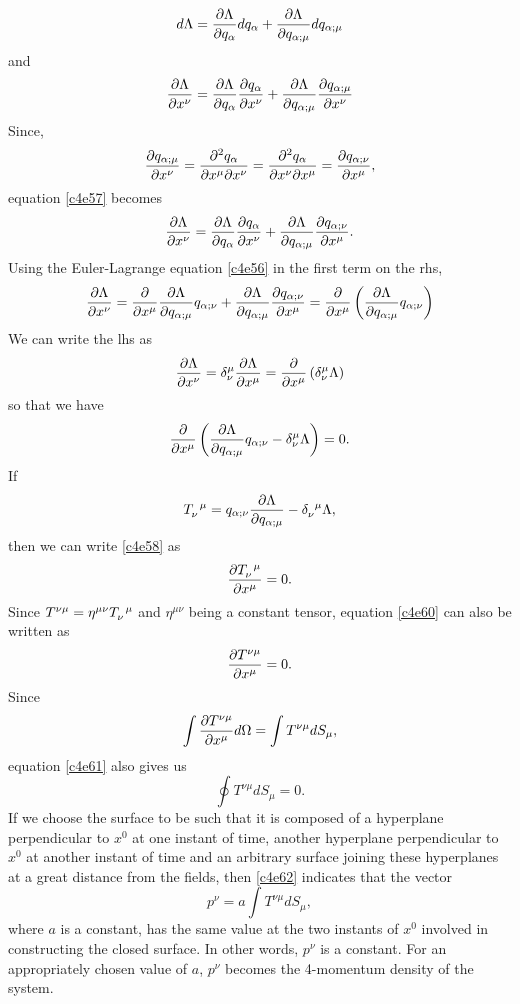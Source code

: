 \begin{enumerate}
\[
d\Lambda = \frac{\partial{\Lambda}}{\partial{q_\alpha}}dq_\alpha + 
\frac{\partial{\Lambda}}{\partial{q_{\alpha;\mu}}}dq_{\alpha;\mu}
\]
and
\begin{equation}\label{c4e57}
\frac{\partial{\Lambda}}{\partial{x^\nu}} = \frac{\partial{\Lambda}}{\partial{q_\alpha}}\frac{\partial{q_\alpha}}{\partial{x^\nu}} + 
\frac{\partial{\Lambda}}{\partial{q_{\alpha;\mu}}}\frac{\partial{q_{\alpha;\mu}}}{\partial{x^\nu}}
\end{equation}
Since,
\[
\frac{\partial{q_{\alpha;\mu}}}{\partial{x^\nu}} = 
\frac{\partial^2 q_\alpha}{\partial x^\mu \partial x^\nu}
= \frac{\partial^2 q_\alpha}{\partial x^\nu \partial x^\mu} =
\frac{\partial{q_{\alpha;\nu}}}{\partial{x^\mu}},
\]
equation \eqref{c4e57} becomes
\[
\frac{\partial{\Lambda}}{\partial{x^\nu}} = \frac{\partial{\Lambda}}{\partial{q_\alpha}}\frac{\partial{q_\alpha}}{\partial{x^\nu}} + 
\frac{\partial{\Lambda}}{\partial{q_{\alpha;\mu}}}\frac{\partial{q_{\alpha;\nu}}}{\partial{x^\mu}}.
\]
Using the Euler-Lagrange equation \eqref{c4e56} in the first term on the rhs,
\[
\frac{\partial{\Lambda}}{\partial{x^\nu}} = \frac{\partial}{\partial x^\mu}
\frac{\partial{\Lambda}}{\partial{q_{\alpha;\mu}}}
q_{\alpha;\nu} + \frac{\partial{\Lambda}}{\partial{q_{\alpha;\mu}}}\frac{\partial{q_{\alpha;\nu}}}{\partial{x^\mu}} =
\frac{\partial}{\partial x^\mu}
\left(\frac{\partial{\Lambda}}{\partial{q_{\alpha;\mu}}}q_{\alpha;\nu}\right)
\]
We can write the lhs as
\[
\frac{\partial{\Lambda}}{\partial{x^\nu}} = \delta^\mu_\nu\frac{\partial{\Lambda}}{\partial{x^\mu}} = 
\frac{\partial}{\partial x^\mu}\left(\delta^\mu_\nu \Lambda\right)
\]
so that we have
\begin{equation}\label{c4e58}
\frac{\partial}{\partial x^\mu}
\left(\frac{\partial{\Lambda}}{\partial{q_{\alpha;\mu}}}q_{\alpha;\nu} - 
\delta^\mu_\nu \Lambda\right) = 0.
\end{equation}
If
\begin{equation}\label{c4e59}
\tensor{T}{_\nu^\mu} = q_{\alpha;\nu}\pdt{\Lambda}{q_{\alpha;\mu}} - 
\tensor{\delta}{_\nu^\mu} \Lambda,
\end{equation}
then we can write \eqref{c4e58} as
\begin{equation}\label{c4e60}
\pdt{\tensor{T}{_\nu^\mu}}{x^\mu} = 0.
\end{equation}
Since $T^{\nu\mu} = \eta^{\mu\nu}\tensor{T}{_\nu^\mu}$ and $\eta^{\mu\nu}$ 
being a constant tensor, equation \eqref{c4e60} can also be written as
\begin{equation}\label{c4e61}
\frac{\partial{T^{\nu\mu}}}{\partial{x^\mu}} = 0.
\end{equation}
Since
\[
\int \frac{\partial{T^{\nu\mu}}}{\partial{x^\mu}} d\Omega = \int T^{\nu\mu} dS_\mu,
\]
equation \eqref{c4e61} also gives us
\begin{equation}\label{c4e62}
\oint T^{\nu\mu} dS_\mu = 0.
\end{equation}
If we choose the surface to be such that it is composed of a hyperplane 
perpendicular to $x^0$ at one instant of time, another hyperplane 
perpendicular to $x^0$ at another instant of time and an arbitrary surface
joining these hyperplanes at a great distance from the fields, then 
\eqref{c4e62} indicates that the vector
\begin{equation}\label{c4e63}
p^\nu = a\int T^{\nu\mu}dS_\mu,
\end{equation}
where $a$ is a constant, has the same value at the two instants of $x^0$ 
involved in constructing the closed surface. In other words, $p^\nu$ is a 
constant. For an appropriately chosen value of $a$, $p^\nu$ becomes the 
4-momentum density of the system.


\end{enumerate}
